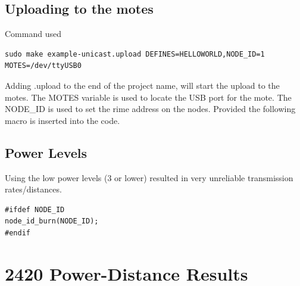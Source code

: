 \documentclass[a4paper,notitlepage]{article}
\begin{document}
\subsection{Uploading to the motes}
Command used
\begin{listing} 
\begin{verbatim}
sudo make example-unicast.upload DEFINES=HELLOWORLD,NODE_ID=1 MOTES=/dev/ttyUSB0
\end{verbatim}
\end{listing}
Adding .upload to the end of the project name, will start the upload to the motes. The MOTES variable is used to locate the USB port for the mote.
The NODE\_ID is used to set the rime address on the nodes. Provided the following macro is inserted into the code.

\subsection{Power Levels}
Using the low power levels (3 or lower) resulted in very unreliable transmission rates/distances. 

\begin{listing} 
\begin{verbatim}
#ifdef NODE_ID
node_id_burn(NODE_ID);
#endif
\end{verbatim}
\end{listing}

\clearpage




\clearpage



\clearpage

\appendixpage
\addappheadtotoc
\appendix



\newpage

\section{2420 Power-Distance Results}
\end{document}
